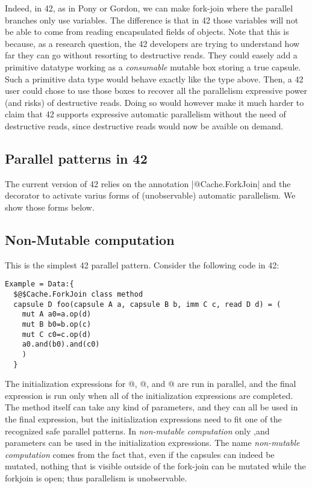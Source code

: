 Indeed, in 42, as in Pony or Gordon, we can make fork-join where the parallel branches only use \Q@capsule@ variables.
The difference is that in 42 those variables will not be able to come from reading encapsulated fields of \Q@mut@ objects.
Note that this is because, as a research question, the 42 developers are trying to understand how far they can go without resorting to destructive reads.
They could easely add a primitive datatype working as a \emph{consumable} mutable box storing a true capsule. Such a primitive data type would behave exactly like the \Q@Box@ type above.
Then, a 42 user could chose to use those boxes to recover all the parallelism expressive power (and risks) of destructive reads.
Doing so would however make it much harder to claim that 42 supports expressive automatic parallelism without the need of destructive reads, since destructive reads would now be avaible on demand.

\subsection*{Parallel patterns in 42}

The current version of 42 relies on the annotation \Q|$@$Cache.ForkJoin| and the \Q@Data@ decorator to activate varius forms of (unobservable) automatic parallelism. We show those forms below.

\subsection*{Non-Mutable computation}
This is the simplest 42 parallel pattern.
Consider the following code in 42:
\begin{lstlisting}
Example = Data:{
  $@$Cache.ForkJoin class method 
  capsule D foo(capsule A a, capsule B b, imm C c, read D d) = (
    mut A a0=a.op(d)
    mut B b0=b.op(c)
    mut C c0=c.op(d)
    a0.and(b0).and(c0)
    )
  }
\end{lstlisting}
The initialization expressions for @, @, and 
@ are run in parallel, and the final expression is run only when 
all of the initialization expressions are completed.
The method itself can take any kind of parameters, and they can all be used in the final expression, but the initialization expressions need to fit one of the recognized
safe parallel patterns. In \emph{non-mutable computation} only \Q@read@,\Q@capsule@ and \Q@imm@ parameters can be used in the initialization expressions.
The name \emph{non-mutable computation} comes from the fact that, even if the capsules can indeed be mutated, nothing that is visible outside of the fork-join can be mutated while the forkjoin is open; thus parallelism is unobservable.


